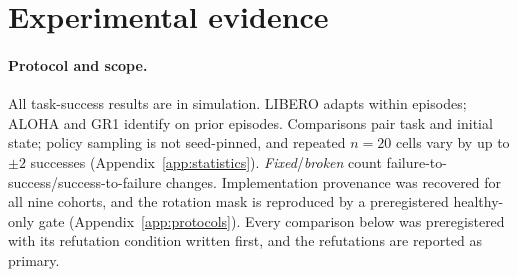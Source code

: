 \section{Experimental evidence}
\label{sec:experiments}
\paragraph{Protocol and scope.}
All task-success results are in simulation. LIBERO \citep{libero} adapts
within episodes; ALOHA \citep{zhao2023aloha} and GR1 identify on prior
episodes. Comparisons pair task and initial state; policy sampling is not
seed-pinned, and repeated $n{=}20$ cells vary by up to $\pm2$ successes
(Appendix~\ref{app:statistics}). \emph{Fixed}/\emph{broken} count failure-to-success/success-to-failure
changes. Implementation provenance was recovered for all nine cohorts, and
the rotation mask is reproduced by a preregistered healthy-only gate
(Appendix~\ref{app:protocols}). Every comparison below was preregistered with
its refutation condition written first, and the refutations are reported as
primary.

